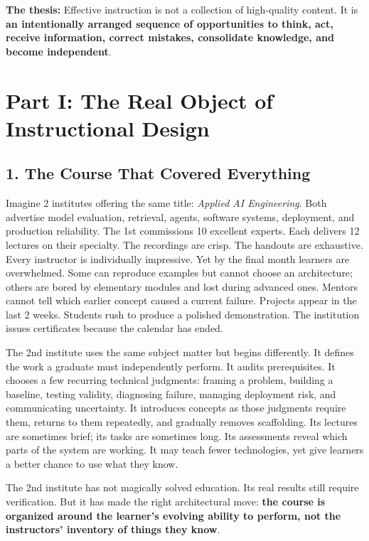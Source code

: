 \textbf{The thesis:} Effective instruction is not a collection of high-quality content. It is \textbf{an intentionally arranged sequence of opportunities to think, act, receive information, correct mistakes, consolidate knowledge, and become independent}.

\section*{Part I: The Real Object of Instructional Design}

\subsection*{1. The Course That Covered Everything}

Imagine 2 institutes offering the same title: \emph{Applied AI Engineering}. Both advertise model evaluation, retrieval, agents, software systems, deployment, and production reliability. The 1st commissions 10 excellent experts. Each delivers 12 lectures on their specialty. The recordings are crisp. The handouts are exhaustive. Every instructor is individually impressive. Yet by the final month learners are overwhelmed. Some can reproduce examples but cannot choose an architecture; others are bored by elementary modules and lost during advanced ones. Mentors cannot tell which earlier concept caused a current failure. Projects appear in the last 2 weeks. Students rush to produce a polished demonstration. The institution issues certificates because the calendar has ended.

The 2nd institute uses the same subject matter but begins differently. It defines the work a graduate must independently perform. It audits prerequisites. It chooses a few recurring technical judgments: framing a problem, building a baseline, testing validity, diagnosing failure, managing deployment risk, and communicating uncertainty. It introduces concepts as those judgments require them, returns to them repeatedly, and gradually removes scaffolding. Its lectures are sometimes brief; its tasks are sometimes long. Its assessments reveal which parts of the system are working. It may teach fewer technologies, yet give learners a better chance to use what they know.

The 2nd institute has not magically solved education. Its real results still require verification. But it has made the right architectural move: \textbf{the course is organized around the learner's evolving ability to perform, not the instructors' inventory of things they know}.

